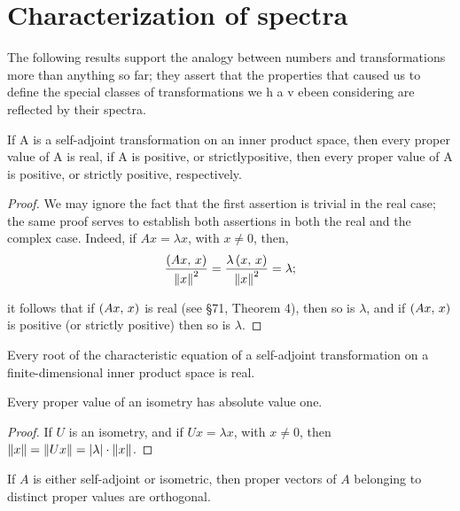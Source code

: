 \section{Characterization of spectra}

The following results support the analogy between numbers and transformations
more than anything so far; they assert that the properties that caused us to
define the special classes of transformations we h a v ebeen considering are
reflected by their spectra.

\begin{theorem}
    If A is a self-adjoint transformation on an inner product space, then every proper value of A is real, if A is positive, or strictlypositive, then every proper value of A is positive, or strictly positive, respectively.
\end{theorem}

\begin{proof}
    We may ignore the fact that the first assertion is trivial in the real case; the same proof serves to establish both assertions in both the real and the complex case. Indeed, if \(Ax = \lambda x\), with \(x \neq 0\), then,
    \begin{equation*}
        \frac{\left(Ax,\,x\right)}{\left\lVert x\right\rVert^2}
        = \frac{\lambda\left(x,\,x\right)}{\left\lVert x\right\rVert^2}
        = \lambda;
    \end{equation*}

    it follows that if \(\left(Ax,\,x\right)\) is real (see §71, Theorem 4), then so is \(\lambda\), and if \(\left(Ax,\,x\right)\) is positive (or strictly positive) then so is \(\lambda\).
\end{proof}

\begin{theorem}
    Every root of the characteristic equation of a self-adjoint transformation on a finite-dimensional inner product space is real.
\end{theorem}

\begin{theorem}
    Every proper value of an isometry has absolute value one.
\end{theorem}

\begin{proof}
    If \(U\) is an isometry, and if \(Ux = \lambda x\), with \(x \neq 0\), then \(\left\lVert x\right\rVert = \left\lVert Ux\right\rVert = \left\lvert\lambda\right\rvert \cdot \left\lVert x\right\rVert\).
\end{proof}

\begin{theorem}
    If \(A\) is either self-adjoint or isometric, then proper vectors of \(A\) belonging to distinct proper values are orthogonal.
\end{theorem}

